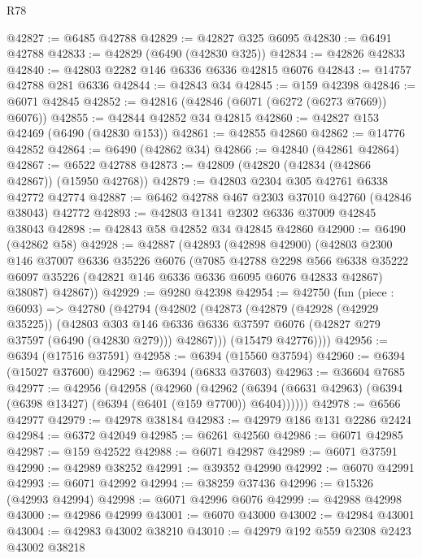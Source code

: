 \begin{lexlean}{R78}
\begin{coremodule}
@42827 := @6485 @42788
@42829 := @42827 @325 @6095
@42830 := @6491 @42788
@42833 := @42829 (@6490 (@42830 @325))
@42834 := @42826 @42833
@42840 := @42803 @2282 @146 @6336 @6336 @42815 @6076
@42843 := @14757 @42788 @281 @6336
@42844 := @42843 @34
@42845 := @159 @42398
@42846 := @6071 @42845
@42852 := @42816 (@42846 (@6071 (@6272 (@6273 @7669)) @6076))
@42855 := @42844 @42852 @34 @42815
@42860 := @42827 @153 @42469 (@6490 (@42830 @153))
@42861 := @42855 @42860
@42862 := @14776 @42852
@42864 := @6490 (@42862 @34)
@42866 := @42840 (@42861 @42864)
@42867 := @6522 @42788
@42873 := @42809 (@42820 (@42834 (@42866 @42867)) (@15950 @42768))
@42879 := @42803 @2304 @305 @42761 @6338 @42772 @42774
@42887 := @6462 @42788 @467 @2303 @37010 @42760 (@42846 @38043) @42772
@42893 := @42803 @1341 @2302 @6336 @37009 @42845 @38043
@42898 := @42843 @58 @42852 @34 @42845 @42860
@42900 := @6490 (@42862 @58)
@42928 := @42887
    (@42893
      (@42898 @42900)
      (@42803
        @2300
        @146
        @37007
        @6336
        @35226
        @6076
        (@7085
          @42788
          @2298
          @566
          @6338
          @35222
          @6097
          @35226
          (@42821 @146 @6336 @6336 @6095 @6076 @42833 @42867)
          @38087)
        @42867))
@42929 := @9280 @42398
@42954 := @42750
    (fun (piece : @6093) =>
    @42780
      (@42794
        (@42802
          (@42873
            (@42879
              (@42928 (@42929 @35225))
              (@42803
                @303
                @146
                @6336
                @6336
                @37597
                @6076
                (@42827 @279 @37597 (@6490 (@42830 @279)))
                @42867)))
          (@15479 @42776))))
@42956 := @6394 (@17516 @37591)
@42958 := @6394 (@15560 @37594)
@42960 := @6394 (@15027 @37600)
@42962 := @6394 (@6833 @37603)
@42963 := @36604 @7685
@42977 := @42956
    (@42958
      (@42960
        (@42962 (@6394 (@6631 @42963) (@6394 (@6398 @13427) (@6394 (@6401 (@159 @7700)) @6404))))))
@42978 := @6566 @42977
@42979 := @42978 @38184
@42983 := @42979 @186 @131 @2286 @2424
@42984 := @6372 @42049
@42985 := @6261 @42560
@42986 := @6071 @42985
@42987 := @159 @42522
@42988 := @6071 @42987
@42989 := @6071 @37591
@42990 := @42989 @38252
@42991 := @39352 @42990
@42992 := @6070 @42991
@42993 := @6071 @42992
@42994 := @38259 @37436
@42996 := @15326 (@42993 @42994)
@42998 := @6071 @42996 @6076
@42999 := @42988 @42998
@43000 := @42986 @42999
@43001 := @6070 @43000
@43002 := @42984 @43001
@43004 := @42983 @43002 @38210
@43010 := @42979 @192 @559 @2308 @2423 @43002 @38218

\end{coremodule}
\end{lexlean}
